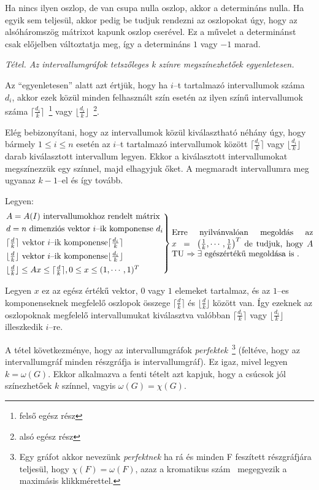 Ha nincs ilyen oszlop, de van csupa nulla oszlop, akkor a determináns nulla. Ha
egyik sem teljesül, akkor pedig be tudjuk rendezni az oszlopokat úgy, hogy az
alsóháromszög mátrixot kapunk oszlop cserével. Ez a művelet a determinánst csak
előjelben változtatja meg, így a determináns $1$ vagy $-1$ marad.
\vspace{0.4cm}

\emph{Tétel. Az intervallumgráfok tetszőleges k színre megszínezhetőek
egyenletesen.}
\vspace{0.4cm}

Az ``egyenletesen'' alatt azt értjük, hogy ha $i$--t tartalmazó intervallumok
száma $d_i$, akkor ezek közül minden felhasznált szín esetén az ilyen színű
intervallumok száma $\lceil \frac{d_i}{k} \rceil$~\footnote{felső egész rész}
vagy $\lfloor \frac{d_i}{k} \rfloor$~\footnote{alsó egész rész}.

Elég bebizonyítani, hogy az intervallumok közül kiválasztható néhány úgy, hogy
bármely $1 \leq i \leq n$ esetén az $i$--t tartalmazó intervallumok között
$\lceil \frac{d_i}{k} \rceil$ vagy $\lfloor \frac{d_i}{k} \rfloor$ darab
kiválasztott intervallum legyen. Ekkor a kiválasztott intervallumokat
megszínezzük egy színnel, majd elhagyjuk őket. A megmaradt intervallumra meg
ugyanaz $k-1$--el és így tovább.

Legyen:
\[\begin{rcases}
A=A(I) \mbox{ intervallumokhoz rendelt mátrix}\\
d = n \text{ dimenziós vektor } i \text{--ik komponense } d_i \\
\lceil \frac{d}{k} \rceil \text{ vektor } i \text{--ik komponense} \lceil \frac{d_i}{k} \rceil \\
\lfloor \frac{d}{k} \rfloor \text{ vektor } i \text{--ik komponense} \lfloor
\frac{d_i}{k} \rfloor \\
\lfloor \frac{d}{k} \rfloor \leq Ax \leq \lceil \frac{d}{k} \rceil, 0 \leq x
\leq (1,\cdots, 1)^T \end{rcases} \parbox[L]{6cm}{Erre nyilvánvalóan megoldás az
$x~=~\left( \frac{1}{k}, \cdots, \frac{1}{k} \right)^T$ de tudjuk, hogy $A$ TU
$\Rightarrow \exists$ egészértékű megoldása is .}
\]

Legyen $x$ ez az egész értékű vektor, $0$ vagy $1$ elemeket tartalmaz, és az
$1$--es komponenseknek megfelelő oszlopok összege $\lceil \frac{d}{k} \rceil$ és
$ \lfloor \frac{d}{k} \rfloor$ között van. Így ezeknek az oszlopoknak megfelelő
intervallumukat kiválasztva valóbban $\lceil \frac{d_i}{k} \rceil$ vagy $
\lfloor \frac{d_i}{k} \rfloor$ illeszkedik $i$--re.

A tétel következménye, hogy az intervallumgráfok \emph{perfektek}~\footnote{ Egy
gráfot akkor nevezünk \emph{perfektnek} ha rá és minden F feszített részgráfjára
teljesül, hogy $\chi(F) = \omega(F)$, azaz a kromatikus szám~\footnotemark{}
megegyezik a maximásis klikkmérettel.} (feltéve, hogy az intervallumgráf minden részgráfja is intervallumgráf).
Ez igaz, mivel legyen $k=\omega(G)$. Ekkor alkalmazva a fenti tételt azt kapjuk,
hogy a csúcsok jól színezhetőek $k$ színnel, vagyis $\omega(G)=\chi(G)$.